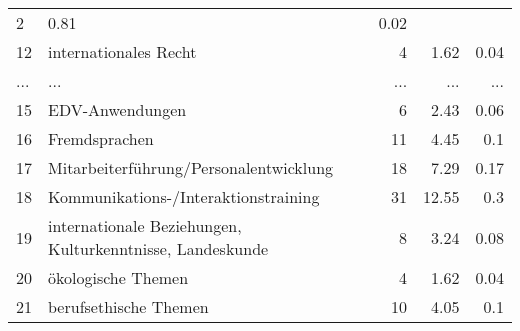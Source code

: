 \begin{longtable}{lXrrr}
          \num{2} &
          \num[round-mode=places,round-precision=2]{0,81} &
          \num[round-mode=places,round-precision=2]{0,02} \\
        12 & \multicolumn{1}{X}{internationales Recht} & %
          \num{4} &
          \num[round-mode=places,round-precision=2]{1,62} &
          \num[round-mode=places,round-precision=2]{0,04} \\
       ... & ... & ... & ... & ... \\
        15 & \multicolumn{1}{X}{EDV-Anwendungen} & %
          \num{6} &
          \num[round-mode=places,round-precision=2]{2,43} &
          \num[round-mode=places,round-precision=2]{0,06} \\

        16 & \multicolumn{1}{X}{Fremdsprachen} & %
          \num{11} &
          \num[round-mode=places,round-precision=2]{4,45} &
          \num[round-mode=places,round-precision=2]{0,1} \\

        17 & \multicolumn{1}{X}{Mitarbeiterführung/Personalentwicklung} & %
          \num{18} &
          \num[round-mode=places,round-precision=2]{7,29} &
          \num[round-mode=places,round-precision=2]{0,17} \\

        18 & \multicolumn{1}{X}{Kommunikations-/Interaktionstraining} & %
          \num{31} &
          \num[round-mode=places,round-precision=2]{12,55} &
          \num[round-mode=places,round-precision=2]{0,3} \\

        19 & \multicolumn{1}{X}{internationale Beziehungen, Kulturkenntnisse, Landeskunde} & %
          \num{8} &
          \num[round-mode=places,round-precision=2]{3,24} &
          \num[round-mode=places,round-precision=2]{0,08} \\

        20 & \multicolumn{1}{X}{ökologische Themen} & %
          \num{4} &
          \num[round-mode=places,round-precision=2]{1,62} &
          \num[round-mode=places,round-precision=2]{0,04} \\

        21 & \multicolumn{1}{X}{berufsethische Themen} & %
          \num{10} &
          \num[round-mode=places,round-precision=2]{4,05} &
          \num[round-mode=places,round-precision=2]{0,1} \\


\end{longtable}
